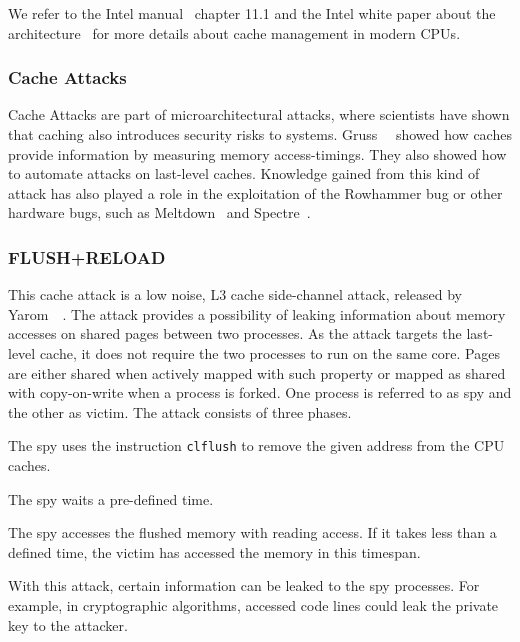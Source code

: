 We refer to the Intel manual~\cite{intelsys} chapter 11.1 and the Intel white
paper about the architecture~\cite{intelwhite} for more details about cache
management in modern CPUs.

\subsubsection{Cache Attacks}

Cache Attacks are part of microarchitectural attacks, where scientists have
shown that caching also introduces security risks to systems.
Gruss~\etal~\cite{gruss2015cache} showed how caches provide information by
measuring memory access-timings. They also showed how to automate attacks on
last-level caches. Knowledge gained from this kind of attack has also played
a role in the exploitation of the Rowhammer bug or other hardware bugs, such as
Meltdown~\cite{meltdown} and Spectre~\cite{spectre}.

\subsubsection{FLUSH+RELOAD}

This cache attack is a low noise, L3 cache side-channel attack, released
by Yarom~\etal~\cite{flushreload}. The attack provides a possibility of leaking
information about memory accesses on shared pages between two processes. As the
attack targets the last-level cache, it does not require the two processes to
run on the same core. Pages are either shared when actively mapped with such
property or mapped as shared with copy-on-write when a process is forked. One
process is referred to as spy and the other as victim. The attack consists of
three phases.

\begin{enumerate}
\begin{samepage}
\item The spy uses the instruction \texttt{clflush} to remove the given address
from the CPU caches.
\item The spy waits a pre-defined time.
\item The spy accesses the flushed memory with reading access. If it takes less
than a defined time, the victim has accessed the memory in this timespan.
\end{samepage}
\end{enumerate}

With this attack, certain information can be leaked to the spy processes. For
example, in cryptographic algorithms, accessed code lines could leak the private
key to the attacker.


